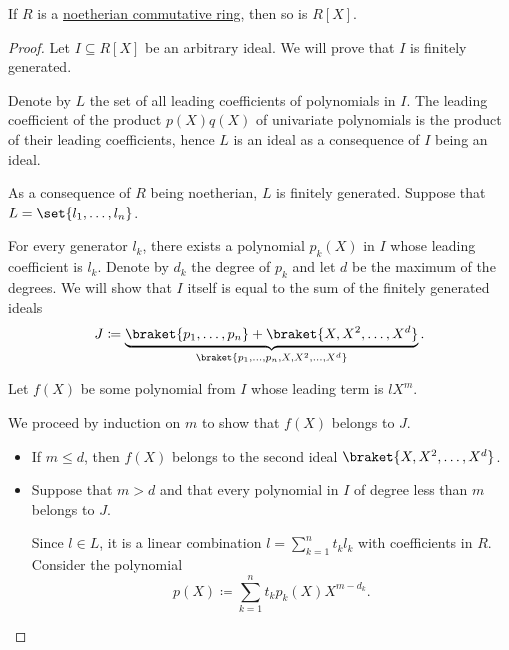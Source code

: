 \begin{theorem}\label{thm:hilberts_basis_theorem}
  If \( R \) is a \hyperref[def:noetherian_semiring]{noetherian commutative ring}, then so is \( R[X] \).
\end{theorem}
\begin{proof}
  Let \( I \subseteq R[X] \) be an arbitrary ideal. We will prove that \( I \) is finitely generated.

  Denote by \( L \) the set of all leading coefficients of polynomials in \( I \). The leading coefficient of the product \( p(X) q(X) \) of univariate polynomials is the product of their leading coefficients, hence \( L \) is an ideal as a consequence of \( I \) being an ideal.

  As a consequence of \( R \) being noetherian, \( L \) is finitely generated. Suppose that \( L = \set{ l_1, \ldots, l_n } \).

  For every generator \( l_k \), there exists a polynomial \( p_k(X) \) in \( I \) whose leading coefficient is \( l_k \). Denote by \( d_k \) the degree of \( p_k \) and let \( d \) be the maximum of the degrees. We will show that \( I \) itself is equal to the sum of the finitely generated ideals
  \begin{equation*}
    J \coloneqq \underbrace{ \braket{ p_1, \ldots, p_n } + \braket{ X, X^2, \ldots, X^d } }_{ \braket{ p_1, \ldots, p_n, X, X^2, \ldots, X^d } }.
  \end{equation*}

  Let \( f(X) \) be some polynomial from \( I \) whose leading term is \( l X^m \).

  We proceed by induction on \( m \) to show that \( f(X) \) belongs to \( J \).
  \begin{itemize}
    \item If \( m \leq d \), then \( f(X) \) belongs to the second ideal \( \braket{ X, X^2, \ldots, X^d } \).

    \item Suppose that \( m > d \) and that every polynomial in \( I \) of degree less than \( m \) belongs to \( J \).

    Since \( l \in L \), it is a linear combination \( l = \sum_{k=1}^n t_k l_k \) with coefficients in \( R \). Consider the polynomial
    \begin{equation*}
      p(X) \coloneqq \sum_{k=1}^n t_k p_k(X) X^{m - d_k}.
    \end{equation*}


\end{itemize}
\end{proof}
